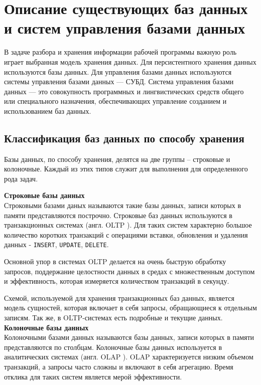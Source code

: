 \section{Описание существующих баз данных и систем управления базами данных}
В задаче разбора и хранения информации рабочей программы важную роль играет выбранная модель хранения данных. Для персистентного хранения данных используются базы данных. Для управления базами данных используются системы управления базами данных --- СУБД. Система управления базами данных --- это совокупность программных и лингвистических средств общего или специального назначения, обеспечивающих управление созданием и использованием баз данных.


\subsection{Классификация баз данных по способу хранения}

Базы данных, по способу хранения, делятся на две группы -- строковые и колоночные. Каждый из этих типов служит для выполнения для определенного рода задач.

\noindent\textbf{Строковые базы данных}\\

Строковыми базами даных называются такие базы данных, записи которых в памяти представляются построчно. Строковые баз данных используются в транзакционных системах (англ. OLTP \cite{OLTP}). Для таких систем характерно большое количество коротких транзакций с операциями вставки, обновления и удаления данных - \texttt{INSERT}, \texttt{UPDATE}, \texttt{DELETE}. 

Основной упор в системах OLTP делается на очень быструю обработку запросов, поддержание целостности данных в средах с множественным доступом и эффективность, которая измеряется количеством транзакций в секунду. 

Схемой, используемой для хранения транзакционных баз данных, является модель сущностей, которая включает в себя запросы, обращающиеся к отдельным записям. Так же, в OLTP-системах есть подробные и текущие данных.\\

\noindent\textbf{Колоночные базы данных}\\

Колоночными базами данных называются базы данных, записи которых в памяти представляются по столбцам. Колоночные базы данных используется в аналитических системах (англ. OLAP \cite{olap}). OLAP характеризуется низким объемом транзакций, а запросы часто сложны и включают в себя агрегацию. Время отклика для таких систем является мерой эффективности.

